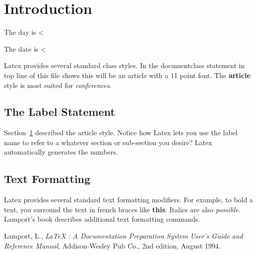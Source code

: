 \documentclass[11pt]{article}
\begin{document}
         
\section{Introduction}
\label{Introduction}

The day is <%

The date is <%

Latex provides several standard class styles.  In the
documentclass statement in top line of this file shows this
will be an article with a 11 point font.  The {\bf article} 
style is most suited for {\it conferences}.

\subsection{The Label Statement}
\label{labelStatement}

Section~\ref{Introduction} described the article style.  Notice
how Latex lets you use the label name to refer to a whatever
section or sub-section you desire?  Latex automatically generates
the numbers.

\subsection{Text Formatting}
\label{textFormatting}

Latex provides several standard text formatting modifiers.
For example, to bold a text, you surround the text in french
braces like {\bf this}.  Italics are also {\it possible}.
Lamport's book \cite{lamport} describes additional text formatting
commands.

\begin{thebibliography}{99}
 Lamport, L., {\it LaTeX : A Documentation
 Preparation System User's Guide and Reference Manual}, Addison-Wesley 
 Pub Co., 2nd edition, August 1994.
\end{thebibliography}
 
\end{document}
